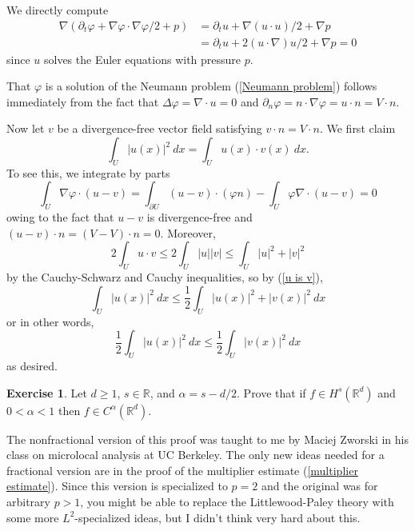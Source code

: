 \documentclass[10pt]{article}
\newcommand{\RR}{\mathbb{R}}
\theoremstyle{definition}
\newtheorem{exer}{Exercise}
\begin{document}
We directly compute
\begin{align*}
\nabla(\partial_t\varphi + \nabla \varphi \cdot \nabla \varphi/2 + p) &= \partial_t u + \nabla(u \cdot u)/2 + \nabla p\\
&= \partial_t u + 2(u \cdot \nabla)u/2 + \nabla p = 0
\end{align*}
since $u$ solves the Euler equations with pressure $p$.

That $\varphi$ is a solution of the Neumann problem (\ref{Neumann problem}) follows immediately from the fact that $\Delta \varphi = \nabla \cdot u = 0$ and $\partial_n \varphi = n \cdot \nabla \varphi = u \cdot n = V \cdot n$.

Now let $v$ be a divergence-free vector field satisfying $v \cdot n = V \cdot n$.
We first claim
\begin{equation}
\label{u is v}
\int_U |u(x)|^2 ~dx = \int_U u(x) \cdot v(x) ~dx.
\end{equation}
To see this, we integrate by parts
$$\int_U \nabla \varphi \cdot (u - v) = \int_{\partial U} (u - v) \cdot (\varphi n) - \int_U \varphi\nabla \cdot(u - v) = 0$$
owing to the fact that $u - v$ is divergence-free and $(u - v)\cdot n = (V - V) \cdot n = 0$.
Moreover,
$$2\int_U u \cdot v \leq 2\int_U |u||v| \leq \int_U |u|^2 + |v|^2$$
by the Cauchy-Schwarz and Cauchy inequalities, so by (\ref{u is v}),
$$\int_U |u(x)|^2 ~dx \leq \frac{1}{2}\int_U |u(x)|^2 + |v(x)|^2 ~dx$$
or in other words,
$$\frac{1}{2} \int_U |u(x)|^2 ~dx \leq \frac{1}{2} \int_U |v(x)|^2 ~dx$$
as desired.




\begin{exer}
Let $d \geq 1$, $s \in \RR$, and $\alpha = s - d/2$. Prove that if $f \in H^s(\RR^d)$ and $0 < \alpha < 1$ then $f \in C^\alpha(\RR^d)$.
\end{exer}

The nonfractional version of this proof was taught to me by Maciej Zworski in his class on microlocal analysis at UC Berkeley.
The only new ideas needed for a fractional version are in the proof of the multiplier estimate (\ref{multiplier estimate}).
Since this version is specialized to $p = 2$ and the original was for arbitrary $p > 1$, you might be able to replace the Littlewood-Paley theory with some more $L^2$-specialized ideas, but I didn't think very hard about this.
\end{document}
